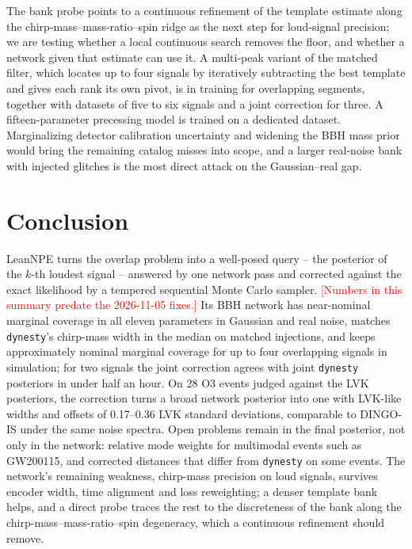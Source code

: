 \documentclass[twocolumn,linenumbers]{aastex701}
\newcommand{\pending}[1]{\textcolor{red}{#1}}
\begin{document}
The bank probe points to a continuous refinement of the template estimate
along the chirp-mass--mass-ratio--spin ridge as the next step for loud-signal
precision; we are testing whether a local continuous search removes the
floor, and whether a network given that estimate can use it. A multi-peak
variant of the matched filter, which locates up to four signals by iteratively
subtracting the best template and gives each rank its own pivot, is in
training for overlapping segments, together with datasets of five to six
signals and a joint correction for three. A fifteen-parameter precessing model
is trained on a dedicated dataset. Marginalizing detector calibration
uncertainty and widening the BBH mass prior would bring the remaining catalog
misses into scope, and a larger real-noise bank with injected glitches is the
most direct attack on the Gaussian--real gap.

\section{Conclusion} \label{sec:conclusion}

LeanNPE turns the overlap problem into a well-posed query -- the posterior of
the $k$-th loudest signal -- answered by one network pass and corrected
against the exact likelihood by a tempered sequential Monte Carlo sampler.
\pending{[Numbers in this summary predate the 2026-11-05 fixes.]} Its BBH network has near-nominal marginal coverage in all eleven parameters in Gaussian and real
noise, matches \texttt{dynesty}'s chirp-mass width in the median on matched
injections, and keeps approximately nominal marginal coverage for up to four
overlapping signals in simulation; for two signals the joint correction agrees
with joint \texttt{dynesty} posteriors in under half an hour. On 28 O3 events
judged against the LVK posteriors, the correction turns a broad network
posterior into one with LVK-like widths and offsets of 0.17--0.36 LVK standard
deviations, comparable to DINGO-IS under the same noise spectra. Open problems
remain in the final posterior, not only in the network: relative mode weights
for multimodal events such as GW200115, and corrected distances that differ
from \texttt{dynesty} on some events. The network's remaining weakness,
chirp-mass precision on loud signals, survives encoder width, time alignment
and loss reweighting; a denser template bank helps, and a direct probe traces
the rest to the discreteness of the bank along the chirp-mass--mass-ratio--spin
degeneracy, which a continuous refinement should remove.
\end{document}
